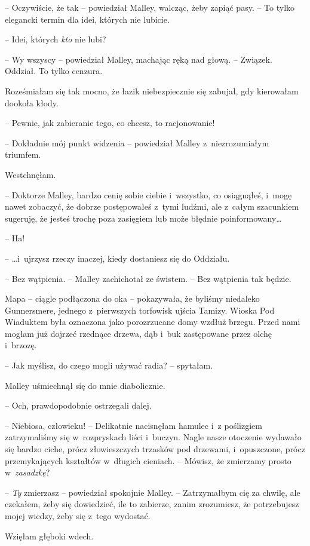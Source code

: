 \documentclass[oneside,polish,11pt,sfheadings]{mwbk}
\begin{document}
-- Oczywiście, że tak -- powiedział Malley, walcząc, żeby zapiąć pasy. -- To tylko elegancki termin dla idei, których nie lubicie.

-- Idei, których \textit{kto} nie lubi?

-- Wy wszyscy -- powiedział Malley, machając ręką nad głową. -- Związek.
Oddział. To tylko cenzura.

Roześmiałam się tak mocno, że łazik niebezpiecznie się zabujał, gdy
kierowałam dookoła kłody. 

-- Pewnie, jak zabieranie tego, co chcesz, to
racjonowanie!

-- Dokładnie mój punkt widzenia -- powiedział Malley z~niezrozumiałym
triumfem.

Westchnęłam. 

-- Doktorze Malley, bardzo cenię sobie ciebie i~wszystko, co
osiągnąłeś, i~mogę nawet zobaczyć, że dobrze postępowałeś z~tymi ludźmi,
ale z~całym szacunkiem sugeruję, że jesteś trochę poza zasięgiem lub
może błędnie poinformowany\ldots 

-- Ha!

-- \ldots  i~ujrzysz rzeczy inaczej, kiedy dostaniesz się do Oddziału.

-- Bez wątpienia. -- Malley zachichotał ze świstem. -- Bez wątpienia tak
będzie.

Mapa -- ciągle podłączona do oka -- pokazywała, że byliśmy niedaleko
Gunnersmere, jednego z~pierwszych torfowisk ujścia Tamizy. Wioska Pod
Wiaduktem była oznaczona jako porozrzucane domy wzdłuż brzegu. Przed
nami mogłam już dojrzeć rzednące drzewa, dąb i~buk zastępowane przez
olchę i~brzozę.

-- Jak myślisz, do czego mogli używać radia? -- spytałam.

Malley uśmiechnął się do mnie diabolicznie. 

-- Och, prawdopodobnie
ostrzegali dalej.

-- Niebiosa, człowieku! -- Delikatnie nacisnęłam hamulec i~z poślizgiem
zatrzymaliśmy się w~rozpryskach liści i~buczyn. Nagle nasze otoczenie
wydawało się bardzo ciche, prócz złowieszczych trzasków pod drzewami, i~opuszczone, prócz przemykających kształtów w~długich cieniach. -- Mówisz,
że zmierzamy prosto w~\textit{zasadzkę}?

-- \textit{Ty} zmierzasz -- powiedział spokojnie Malley. -- Zatrzymałbym cię
za chwilę, ale czekałem, żeby się dowiedzieć, ile to zabierze, zanim
zrozumiesz, że potrzebujesz mojej wiedzy, żeby się z~tego wydostać.

Wzięłam głęboki wdech. 
\end{document}
